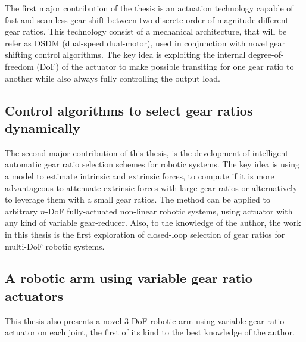 The first major contribution of the thesis is an actuation technology capable of fast and seamless gear-shift between two discrete order-of-magnitude different gear ratios. This technology consist of a mechanical architecture, that will be refer as DSDM (dual-speed dual-motor), used in conjunction with novel gear  shifting control algorithms. The key idea is exploiting the internal degree-of-freedom (DoF) of the actuator to make possible transiting for one gear ratio to another while also always fully controlling the output load. 

\subsection{Control algorithms to select gear ratios dynamically}

The second major contribution of this thesis, is the development of intelligent automatic gear ratio selection schemes for robotic systems. The key idea is using a model to estimate intrinsic and extrinsic forces, to compute if it is more advantageous to attenuate extrinsic forces with large gear ratios or alternatively to leverage them with a small gear ratios. The method can be applied to arbitrary $n$-DoF fully-actuated non-linear robotic systems, using actuator with any kind of variable gear-reducer. Also, to the knowledge of the author, the work in this thesis is the first exploration of closed-loop selection of gear ratios for multi-DoF robotic systems.



\subsection{A robotic arm using variable gear ratio actuators}

This thesis also presents a novel 3-DoF robotic arm using variable gear ratio actuator on each joint, the first of its kind to the best knowledge of the author. %

